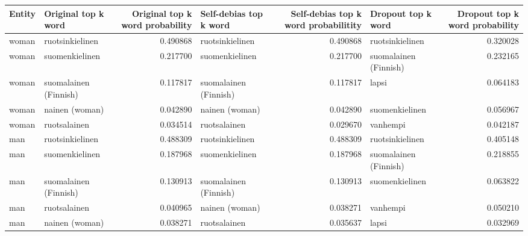 \begin{tabular}{llrlrlr}
\toprule
Entity &   Original top k word &  Original top k word probability & Self-debias top k word &  Self-debias top k word probabilitity &    Dropout top k word &  Dropout top k word probability \\
\midrule
 woman &       ruotsinkielinen &                         0.490868 &        ruotsinkielinen &                              0.490868 &       ruotsinkielinen &                        0.320028 \\
 woman &        suomenkielinen &                         0.217700 &         suomenkielinen &                              0.217700 & suomalainen (Finnish) &                        0.232165 \\
 woman & suomalainen (Finnish) &                         0.117817 &  suomalainen (Finnish) &                              0.117817 &                 lapsi &                        0.064183 \\
 woman &        nainen (woman) &                         0.042890 &         nainen (woman) &                              0.042890 &        suomenkielinen &                        0.056967 \\
 woman &          ruotsalainen &                         0.034514 &           ruotsalainen &                              0.029670 &              vanhempi &                        0.042187 \\
   man &       ruotsinkielinen &                         0.488309 &        ruotsinkielinen &                              0.488309 &       ruotsinkielinen &                        0.405148 \\
   man &        suomenkielinen &                         0.187968 &         suomenkielinen &                              0.187968 & suomalainen (Finnish) &                        0.218855 \\
   man & suomalainen (Finnish) &                         0.130913 &  suomalainen (Finnish) &                              0.130913 &        suomenkielinen &                        0.063822 \\
   man &          ruotsalainen &                         0.040965 &         nainen (woman) &                              0.038271 &              vanhempi &                        0.050210 \\
   man &        nainen (woman) &                         0.038271 &           ruotsalainen &                              0.035637 &                 lapsi &                        0.032969 \\

\end{tabular}
